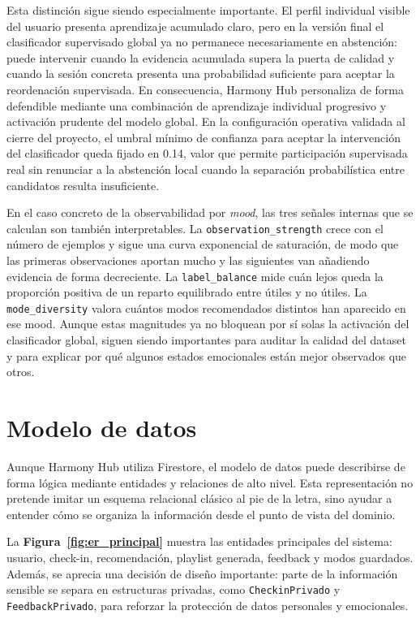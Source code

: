 Esta distinción sigue siendo especialmente importante. El perfil individual
visible del usuario presenta aprendizaje acumulado claro, pero en la versión
final el clasificador supervisado global ya no permanece necesariamente en
abstención: puede intervenir cuando la evidencia acumulada supera la puerta de
calidad y cuando la sesión concreta presenta una probabilidad suficiente para
aceptar la reordenación supervisada. En consecuencia, Harmony Hub personaliza
de forma defendible mediante una combinación de aprendizaje individual
progresivo y activación prudente del modelo global. En la configuración
operativa validada al cierre del proyecto, el umbral mínimo de confianza para
aceptar la intervención del clasificador queda fijado en 0.14, valor que
permite participación supervisada real sin renunciar a la abstención local
cuando la separación probabilística entre candidatos resulta insuficiente.

En el caso concreto de la observabilidad por \textit{mood}, las tres señales
internas que se calculan son también interpretables. La
\texttt{observation\_strength} crece con el número de ejemplos y sigue una
curva exponencial de saturación, de modo que las primeras observaciones
aportan mucho y las siguientes van añadiendo evidencia de forma decreciente.
La \texttt{label\_balance} mide cuán lejos queda la proporción positiva de un
reparto equilibrado entre útiles y no útiles. La \texttt{mode\_diversity}
valora cuántos modos recomendados distintos han aparecido en ese mood. Aunque
estas magnitudes ya no bloquean por sí solas la activación del clasificador
global, siguen siendo importantes para auditar la calidad del dataset y para
explicar por qué algunos estados emocionales están mejor observados que otros.

\section{Modelo de datos}
\label{sec:modelo_datos}

Aunque Harmony Hub utiliza Firestore, el modelo de datos puede describirse de
forma lógica mediante entidades y relaciones de alto nivel. Esta representación
no pretende imitar un esquema relacional clásico al pie de la letra, sino
ayudar a entender cómo se organiza la información desde el punto de vista del
dominio.

La \textbf{Figura~\ref{fig:er_principal}} muestra las entidades principales del
sistema: usuario, check-in, recomendación, playlist generada, feedback y modos
guardados. Además, se aprecia una decisión de diseño importante: parte de la
información sensible se separa en estructuras privadas, como
\texttt{CheckinPrivado} y \texttt{FeedbackPrivado}, para reforzar la protección
de datos personales y emocionales.

